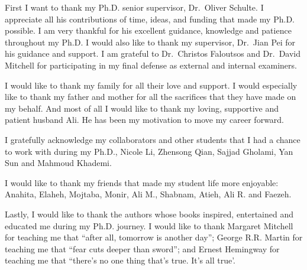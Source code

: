 
%
%

First I want to thank my Ph.D. senior supervisor, Dr.~Oliver Schulte. I appreciate all his contributions of time, ideas, and funding that made my Ph.D. possible. I am very thankful for his excellent guidance, knowledge and patience throughout my Ph.D. I would also like to thank my supervisor, Dr.~Jian Pei for his guidance and support. I am grateful to Dr.~Christos Faloutsos and Dr.~David Mitchell for participating in my final defense as external and internal examiners.

I would like to  thank my family for all their love and support. I would especially  like to thank my father and mother for all the sacrifices that they have made on my behalf. And most of all I would like to thank my loving, supportive and patient husband Ali. He has been my motivation to move my career forward.

I gratefully acknowledge my collaborators and other students that I had a chance to work with during my Ph.D., Nicole Li, Zhensong Qian, Sajjad Gholami, Yan Sun and Mahmoud Khademi.

I would like to thank my friends that made my student life more enjoyable: Anahita, Elaheh, Mojtaba, Monir, Ali M., Shabnam, Atieh, Ali R. and Faezeh. 

Lastly, I would like to thank the authors whose books inspired,  entertained and educated me during my Ph.D. journey. I would like to thank Margaret Mitchell for teaching me that ``after all, tomorrow is another day''; George R.R. Martin for teaching me that ``fear cuts deeper than sword''; and Ernest Hemingway for teaching me that ``there's no one thing that's true. It's all true'.\\ 






